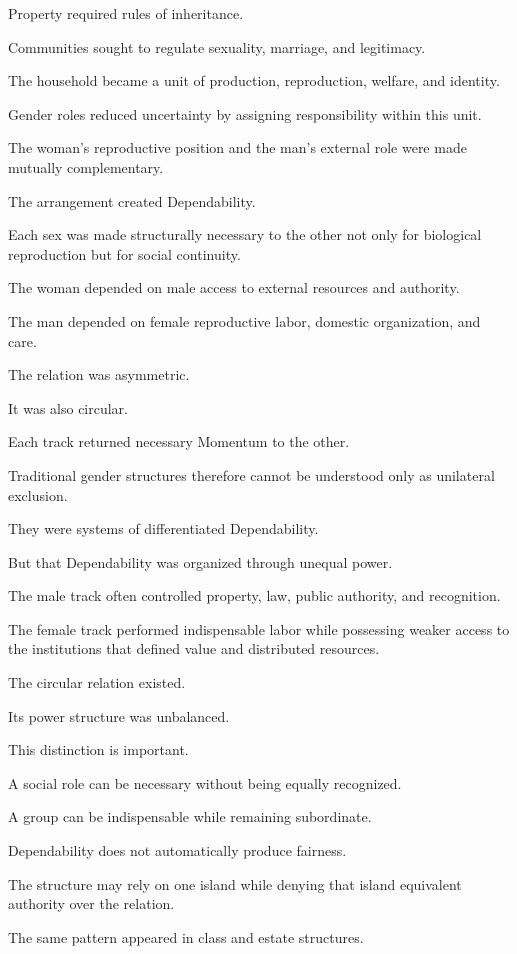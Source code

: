 Property required rules of inheritance.

Communities sought to regulate sexuality, marriage, and legitimacy.

The household became a unit of production, reproduction, welfare, and identity.

Gender roles reduced uncertainty by assigning responsibility within this unit.

The woman’s reproductive position and the man’s external role were made mutually complementary.

The arrangement created Dependability.

Each sex was made structurally necessary to the other not only for biological reproduction but for social continuity.

The woman depended on male access to external resources and authority.

The man depended on female reproductive labor, domestic organization, and care.

The relation was asymmetric.

It was also circular.

Each track returned necessary Momentum to the other.

Traditional gender structures therefore cannot be understood only as unilateral exclusion.

They were systems of differentiated Dependability.

But that Dependability was organized through unequal power.

The male track often controlled property, law, public authority, and recognition.

The female track performed indispensable labor while possessing weaker access to the institutions that defined value and distributed resources.

The circular relation existed.

Its power structure was unbalanced.

This distinction is important.

A social role can be necessary without being equally recognized.

A group can be indispensable while remaining subordinate.

Dependability does not automatically produce fairness.

The structure may rely on one island while denying that island equivalent authority over the relation.

The same pattern appeared in class and estate structures.

